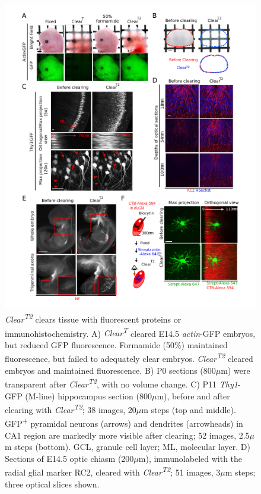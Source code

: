 \begin{figure}[hbtp]
    \begin{center}
        \includegraphics{Figures/ClearT_Fig3}
        \caption[\emph{Clear\textsuperscript{T2}} clears tissue with fluorescent proteins or immunohistochemistry.]
        {\emph{Clear\textsuperscript{T2}} clears tissue with fluorescent proteins or immunohistochemistry.
		A) \emph{Clear\textsuperscript{T}} cleared E14.5 \emph{actin}-GFP embryos, but reduced GFP fluorescence.
		Formamide (50\%) maintained fluorescence, but failed to adequately clear embryos.
		\emph{Clear\textsuperscript{T2}} cleared embryos and maintained fluorescence.
		B) P0 sections (800$\mu$m) were transparent after \emph{Clear\textsuperscript{T2}}, with no volume change.
		C) P11 \emph{Thy1}-GFP (M-line) hippocampus section (800$\mu$m), before and after clearing with \emph{Clear\textsuperscript{T2}}; 38 images, 20$\mu$m steps (top and middle).
		GFP\textsuperscript{+} pyramidal neurons (arrows) and dendrites (arrowheads) in CA1 region are markedly more visible after clearing; 52 images, 2.5$\mu$m steps (bottom).
		GCL, granule cell layer; ML, molecular layer.
		D) Sections of E14.5 optic chiasm (200$\mu$m), immunolabeled with the radial glial marker RC2, cleared with \emph{Clear\textsuperscript{T2}}; 51 images, 3$\mu$m steps; three optical slices shown.
}
\end{center}
\end{figure}
